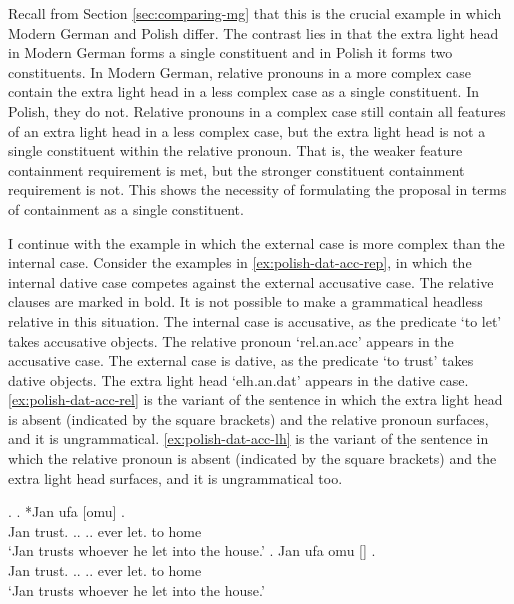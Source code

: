 Recall from Section \ref{sec:comparing-mg} that this is the crucial example in which Modern German and Polish differ. The contrast lies in that the extra light head in Modern German forms a single constituent and in Polish it forms two constituents. In Modern German, relative pronouns in a more complex case contain the extra light head in a less complex case as a single constituent. In Polish, they do not. Relative pronouns in a complex case still contain all features of an extra light head in a less complex case, but the extra light head is not a single constituent within the relative pronoun. That is, the weaker feature containment requirement is met, but the stronger constituent containment requirement is not. This shows the necessity of formulating the proposal in terms of containment as a single constituent.

I continue with the example in which the external case is more complex than the internal case.
Consider the examples in \ref{ex:polish-dat-acc-rep}, in which the internal dative case competes against the external accusative case. The relative clauses are marked in bold. It is not possible to make a grammatical headless relative in this situation.
The internal case is accusative, as the predicate  `to let' takes accusative objects. The relative pronoun  `\ac{rel}.\ac{an}.\ac{acc}' appears in the accusative case.
The external case is dative, as the predicate  `to trust' takes dative objects. The extra light head  `\ac{elh}.\ac{an}.\ac{dat}' appears in the dative case.
\ref{ex:polish-dat-acc-rel} is the variant of the sentence in which the extra light head is absent (indicated by the square brackets) and the relative pronoun surfaces, and it is ungrammatical.
\ref{ex:polish-dat-acc-lh} is the variant of the sentence in which the relative pronoun is absent (indicated by the square brackets) and the extra light head surfaces, and it is ungrammatical too.

\ex.\label{ex:polish-dat-acc-rep}
\ag. *Jan ufa [omu]     .\\
Jan trust.\scsub{[dat]} .. .. ever let.\scsub{[acc]} to home\\
`Jan trusts whoever he let into the house.' \label{ex:polish-dat-acc-rel}
\bg. Jan ufa omu []    .\\
Jan trust.\scsub{[dat]} .. .. ever let.\scsub{[acc]} to home\\
`Jan trusts whoever he let into the house.' \label{ex:polish-dat-acc-lh}

